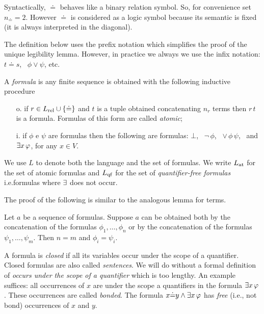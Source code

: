 %
%

%


Syntactically, $\doteq$ behaves like a binary relation symbol. So, for convenience set $n_{\scriptscriptstyle\doteq}=2$. However $\doteq$ is considered as a logic symbol because its semantic is fixed (it is always interpreted in the diagonal).

The definition below uses the prefix notation which simplifies the proof of the unique legibility lemma. However, in practice we always we use the infix notation: $t\doteq s$, \ $\phi\vee\psi$, etc.


\begin{definition}\label{defformule} 
A \emph{formula\/} is any finite sequence is obtained with the following inductive procedure

\begin{itemize}
\item[o.] if $r\in L_{\rm rel}\cup \{\doteq\}$ and $t$ is a tuple obtained concatenating $n_r$ terms then $r\,t$ is a formula. Formulas of this form are called \emph{atomic};

\item[i.] if $\phi$ e $\psi$ are formulas then the following are formulas: $\bot$, \ ${\neg}\,\phi$, \ ${\vee}\,\phi\,\psi$, \ and $\exists x\,\varphi$, for any $x\in V$.\QED
\end{itemize}
\end{definition}


We use \emph{$L$\/} to denote both the language and the set of formulas. We write \emph{$L_{\rm at}$\/} for the set of atomic formulas and \emph{$L_{\rm qf}$\/} for the set of \emph{quantifier-free formulas\/} i.e.\@ formulas where $\exists$ does not occur.

The proof of the following is similar to the analogous lemma for terms.

\begin{lemma}
\label{lemmaformuleleggibilita}
Let $a$ be a sequence of formulas. Suppose $a$ can be obtained both by the concatenation of the formulas $\phi_1,\dots,\phi_n$ or by the concatenation of the formulas $\psi_1,\dots,\psi_m$. Then $n=m$ and $\phi_i=\psi_i$.\QED
\end{lemma}


A formula is \emph{closed\/} if all its variables occur under the scope of a quantifier. Closed formulas are also called \emph{sentences}. We will do without a formal definition of \textit{occurs under the scope of a quantifier\/} which is too lengthy. An example suffices: all occurrences of $x$ are under the scope a quantifiers in the formula $\exists x\,\varphi$. These occurrences are called \emph{bonded}. The formula $x{\doteq}y\wedge\exists x\,\varphi$ has \emph{free\/} (i.e., not bond) occurrences of $x$ and $y$.

